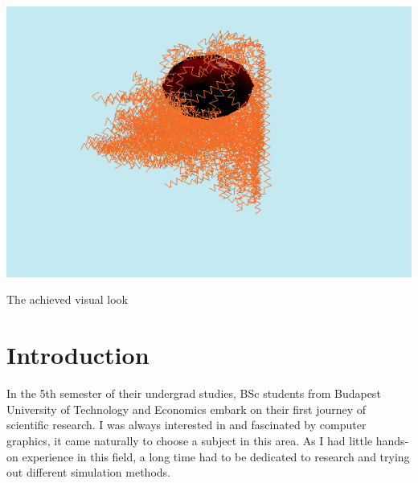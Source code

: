 \documentclass[sigplan,screen,nonacm]{acmart}
\begin{document}

\begin{teaserfigure}
  \includegraphics[width=\textwidth]{teaser_redhead.png}
  \caption{The achieved visual look}
  \label{fig:teaser}
\end{teaserfigure}

\maketitle
\renewcommand{\shortauthors}{Barnabás Börcsök}


\section{Introduction}
In the 5th semester of their undergrad studies, BSc students from Budapest
University of Technology and Economics embark on their first journey of
scientific research. I was always interested in and fascinated by computer 
graphics, it came naturally to choose a subject in this area. As I had little
 hands-on experience in this field, a long time had to be dedicated
to research and trying out different simulation methods.
\end{document}
